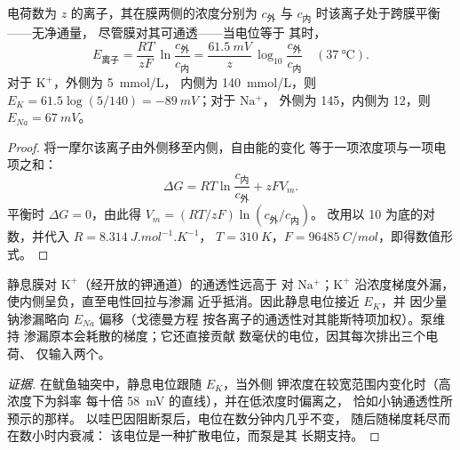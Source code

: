\begin{theorem}[能斯特方程]\label{thm:b1:membranes-transport:nernst}
电荷数为 $z$ 的离子，其在膜两侧的浓度分别为 $c_{\text{外}}$ 与
$c_{\text{内}}$ 时该离子处于跨膜平衡——无净通量，
尽管膜对其可通透——当电位等于
其\emph{}时，
\[
E_{\text{离子}} = \frac{RT}{zF}\,\ln\frac{c_{\text{外}}}{c_{\text{内}}}
= \frac{\qty{61.5}{mV}}{z}\,\log_{10}\frac{c_{\text{外}}}{c_{\text{内}}}
\quad (\qty{37}{\celsius}).
\]
对于 $\mathrm{K^+}$，外侧为 \qty{5}{mmol/L}，
内侧为 \qty{140}{mmol/L}，则 $E_K = 61.5\log(5/140) = \qty{-89}{mV}$；对于 $\mathrm{Na^+}$，
外侧为 \qty{145}{}，内侧为 \qty{12}{}，则 $E_{Na} = \qty{+67}{mV}$。
\end{theorem}
\begin{proof}
将一摩尔该离子由外侧移至内侧，自由能的变化
等于一项浓度项与一项电项之和：
\[
\Delta G = RT\ln\frac{c_{\text{内}}}{c_{\text{外}}} + zFV_m .
\]
平衡时 $\Delta G = 0$，由此得 $V_m = (RT/zF)\ln(c_{\text{外}}/c_{\text{内}})$。
改用以 10 为底的对数，并代入 $R = \qty{8.314}{J.mol^{-1}.K^{-1}}$，
$T = \qty{310}{K}$，$F = \qty{96485}{C/mol}$，即得数值形式。
\end{proof}

\begin{proposition}[静息电位的来源]\label{prop:b1:membranes-transport:resting}
静息膜对 $\mathrm{K^+}$（经开放的钾通道）的通透性远高于
对 $\mathrm{Na^+}$；$\mathrm{K^+}$ 沿浓度梯度外漏，
使内侧呈负，直至电性回拉与渗漏
近乎抵消。因此静息电位接近 $E_K$，并
因少量钠渗漏略向 $E_{Na}$ 偏移（戈德曼方程
按各离子的通透性对其能斯特项加权）。泵维持
渗漏原本会耗散的梯度；它还直接贡献
数毫伏的电位，因其每次排出三个电荷、
仅输入两个。
\end{proposition}
\begin{proof}[证据]
在鱿鱼轴突中，静息电位跟随 $E_K$，当外侧
钾浓度在较宽范围内变化时（高浓度下为斜率
每十倍 \qty{58}{mV} 的直线），并在低浓度时偏离之，
恰如小钠通透性所预示的那样。
以哇巴因阻断泵后，电位在数分钟内几乎不变，
随后随梯度耗尽而在数小时内衰减：
该电位是一种扩散电位，而泵是其
长期支持。
\end{proof}

